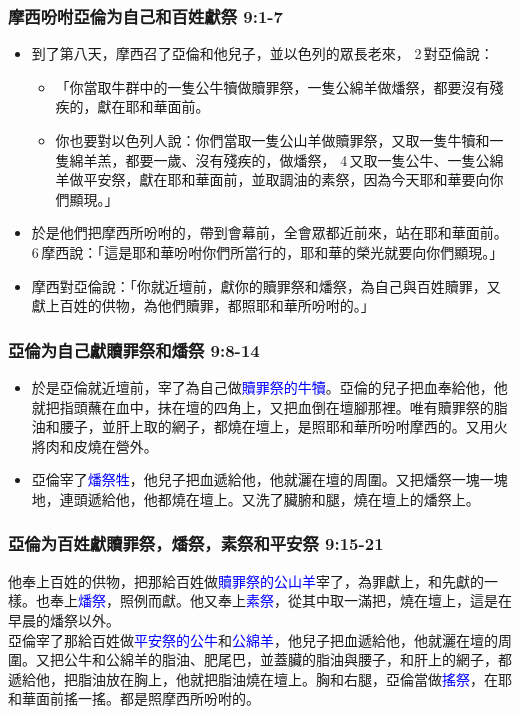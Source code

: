 \subsubsection{摩西吩咐亞倫为自己和百姓獻祭  9:1-7}
\begin{itemize} 
\itemsep-.35em 
\item 到了第八天，摩西召了亞倫和他兒子，並以色列的眾長老來， 2 對亞倫說：
\begin{itemize} 
\itemsep-.35em 
\item 「你當取牛群中的一隻公牛犢做贖罪祭，一隻公綿羊做燔祭，都要沒有殘疾的，獻在耶和華面前。
\item 你也要對以色列人說：你們當取一隻公山羊做贖罪祭，又取一隻牛犢和一隻綿羊羔，都要一歲、沒有殘疾的，做燔祭， 4 又取一隻公牛、一隻公綿羊做平安祭，獻在耶和華面前，並取調油的素祭，因為今天耶和華要向你們顯現。」
\end{itemize}
\item 於是他們把摩西所吩咐的，帶到會幕前，全會眾都近前來，站在耶和華面前。 6 摩西說：「這是耶和華吩咐你們所當行的，耶和華的榮光就要向你們顯現。」 
\item 摩西對亞倫說：「你就近壇前，獻你的贖罪祭和燔祭，為自己與百姓贖罪，又獻上百姓的供物，為他們贖罪，都照耶和華所吩咐的。」
\end{itemize}

\subsubsection{亞倫为自己獻贖罪祭和燔祭  9:8-14}
\begin{itemize} 
\itemsep-.35em 
\item 於是亞倫就近壇前，宰了為自己做\textcolor{blue}{贖罪祭的牛犢}。亞倫的兒子把血奉給他，他就把指頭蘸在血中，抹在壇的四角上，又把血倒在壇腳那裡。唯有贖罪祭的脂油和腰子，並肝上取的網子，都燒在壇上，是照耶和華所吩咐摩西的。又用火將肉和皮燒在營外。
\item 亞倫宰了\textcolor{blue}{燔祭牲}，他兒子把血遞給他，他就灑在壇的周圍。又把燔祭一塊一塊地，連頭遞給他，他都燒在壇上。又洗了臟腑和腿，燒在壇上的燔祭上。
\end{itemize}

\subsubsection{亞倫为百姓獻贖罪祭，燔祭，素祭和平安祭 9:15-21}
他奉上百姓的供物，把那給百姓做\textcolor{blue}{贖罪祭的公山羊}宰了，為罪獻上，和先獻的一樣。也奉上\textcolor{blue}{燔祭}，照例而獻。他又奉上\textcolor{blue}{素祭}，從其中取一滿把，燒在壇上，這是在早晨的燔祭以外。\\
亞倫宰了那給百姓做\textcolor{blue}{平安祭的公牛}和\textcolor{blue}{公綿羊}，他兒子把血遞給他，他就灑在壇的周圍。又把公牛和公綿羊的脂油、肥尾巴，並蓋臟的脂油與腰子，和肝上的網子，都遞給他，把脂油放在胸上，他就把脂油燒在壇上。胸和右腿，亞倫當做\textcolor{blue}{搖祭}，在耶和華面前搖一搖。都是照摩西所吩咐的。

